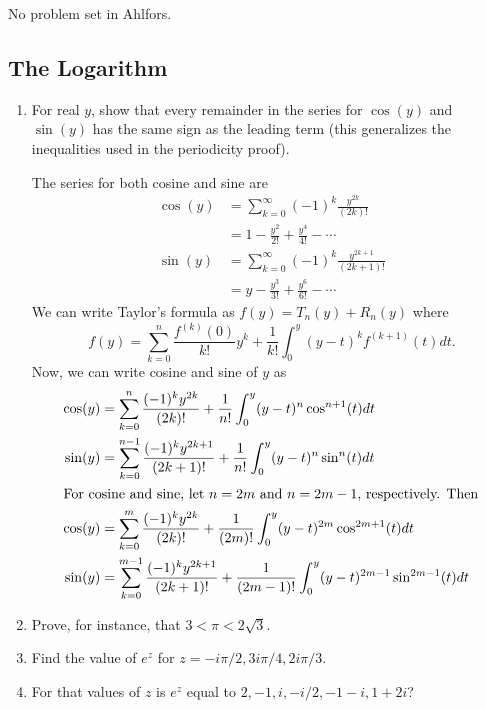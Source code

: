 No problem set in Ahlfors.

\subsection{The Logarithm}

\begin{enumerate}
\item
  For real \(y\), show that every remainder in the series for \(\cos(y)\) and
  \(\sin(y)\) has the same sign as the leading term (this generalizes the
  inequalities used in the periodicity proof).
  \par\smallskip
  The series for both cosine and sine are
  \begin{align*}
    \cos(y) & = \sum_{k = 0}^{\infty}(-1)^k\frac{y^{2k}}{(2k)!}\\
            & = 1 - \frac{y^2}{2!} + \frac{y^4}{4!} - \cdots\\
    \sin(y) & = \sum_{k = 0}^{\infty}(-1)^k\frac{y^{2k + 1}}{(2k + 1)!}\\
            & = y - \frac{y^3}{3!} + \frac{y^6}{6!} - \cdots
  \end{align*}
  We can write Taylor's formula as \(f(y) = T_n(y) + R_n(y)\) where
  \[
  f(y) = \sum_{k = 0}^n\frac{f^{(k)}(0)}{k!}y^k + \frac{1}{k!}\int_0^y(y - t)^k
  f^{(k + 1)}(t)dt.
  \]
  Now, we can write cosine and sine of \(y\) as
  \begin{align*}
    \cos(y) & = \sum_{k = 0}^n\frac{(-1)^ky^{2k}}{(2k)!} + \frac{1}{n!}
              \int_0^y(y - t)^n\cos^{n + 1}(t)dt\\
    \sin(y) & = \sum_{k = 0}^{n - 1}\frac{(-1)^ky^{2k + 1}}{(2k + 1)!} +
              \frac{1}{n!}\int_0^y(y - t)^n\sin^n(t)dt\\
    \intertext{For cosine and sine, let \(n = 2m\) and \(n = 2m - 1\),
    respectively.
    Then}
    \cos(y) & = \sum_{k = 0}^m\frac{(-1)^ky^{2k}}{(2k)!} + \frac{1}{(2m)!}
              \int_0^y(y - t)^{2m}\cos^{2m + 1}(t)dt\\
    \sin(y) & = \sum_{k = 0}^{m - 1}\frac{(-1)^ky^{2k + 1}}{(2k + 1)!} +
              \frac{1}{(2m - 1)!}\int_0^y(y - t)^{2m - 1}\sin^{2m - 1}(t)dt
  \end{align*}
\item
  Prove, for instance, that \(3 < \pi < 2\sqrt{3}\).
\item
  Find the value of \(e^z\) for \(z = -i\pi/2,3i\pi/4,2i\pi/3\).
\item
  For that values of \(z\) is \(e^z\) equal to \(2,-1,i,-i/2,-1 - i,1 + 2i\)?

\end{enumerate}
